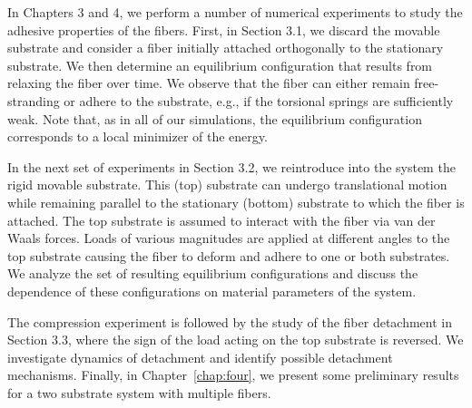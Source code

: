 In Chapters 3 and 4, we perform a number of numerical experiments to study the adhesive properties of the fibers. 
First, in Section 3.1, we discard the movable substrate and consider a fiber initially attached orthogonally to the stationary substrate. 
We then determine an equilibrium configuration that results from relaxing the fiber over time. 
We observe that the fiber can either remain free-stranding or adhere to the substrate, e.g., if the torsional springs are sufficiently weak. 
Note that, as in all of our simulations, the equilibrium configuration corresponds to a local minimizer of the energy.

In the next set of experiments in Section 3.2, we reintroduce into the system the rigid movable substrate. 
This (top) substrate can undergo translational motion while remaining parallel to the stationary (bottom) substrate to which the fiber is attached. 
The top substrate is assumed to interact with the fiber via van der Waals forces. Loads of various magnitudes are applied at different angles to the top substrate causing the fiber to deform and adhere to one or both substrates. 
We analyze the set of resulting equilibrium configurations and discuss the dependence of these configurations on material parameters of the system.

The compression experiment is followed by the study of the fiber detachment in Section 3.3, where the sign of the load acting on the top substrate is reversed. 
We investigate dynamics of detachment and identify possible detachment mechanisms. 
Finally, in Chapter~\ref{chap:four}, we present some preliminary results for a two substrate system with multiple fibers.